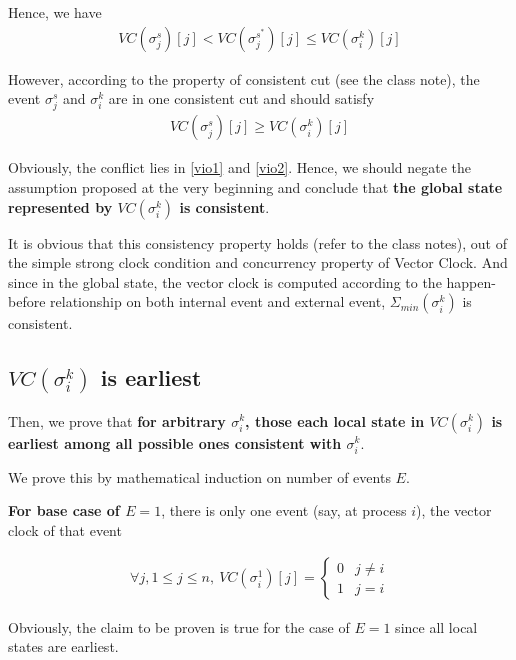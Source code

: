 \documentclass[11pt,a4paper]{article}
\begin{document}
    Hence, we have 
    \begin{align} \label{vio1}
    VC(\sigma_j^s)[j] < VC(\sigma_j^{s^*})[j] \leq VC(\sigma_i^{k})[j]
    \end{align}

    However, according to the property of consistent cut (see the class note),
    the event $\sigma_j^s$ and $\sigma_i^{k}$ are in one consistent cut and
    should satisfy
    \begin{align} \label{vio2}
     VC (\sigma_j^s)[j] \geq VC (\sigma_i^{k})[j] 
    \end{align}

    Obviously, the conflict lies in \eqref{vio1} and \eqref{vio2}. Hence, we
    should negate the assumption proposed at the very beginning and conclude
    that \textbf{the global state represented by $VC(\sigma_i^k)$ is
        consistent}.

It is obvious that this consistency property holds (refer to the class notes),
out of the simple strong clock condition and concurrency property of Vector
Clock. And since in the global state, the vector clock is computed according
to the happen-before relationship on both internal event and external event,
$\Sigma_{min}(\sigma_i^k)$ is consistent.

\newpage
\subsection{$VC(\sigma_i^k)$ is earliest}
Then, we prove that 
    \textbf{for arbitrary $\sigma_i^k$, those each local state in
        $VC(\sigma_i^k)$ is earliest among all possible ones consistent with
        $\sigma_i^k$}.

    We prove this by mathematical induction on number of events $E$. 

    \textbf{For base case of $E = 1$}, there is only one event (say, at process $i$), the vector
    clock of that event 
        
    \begin{eqnarray}
        \forall j, 1 \leq j \leq n,\ VC(\sigma_i^1)[j] =
        \begin{cases}
        0                   & j \neq i \\
        1                   & j = i
        \end{cases}
    \end{eqnarray}
    
    Obviously, the claim to be proven is true for the case of $E = 1$ since all local
    states are earliest.
\end{document}
